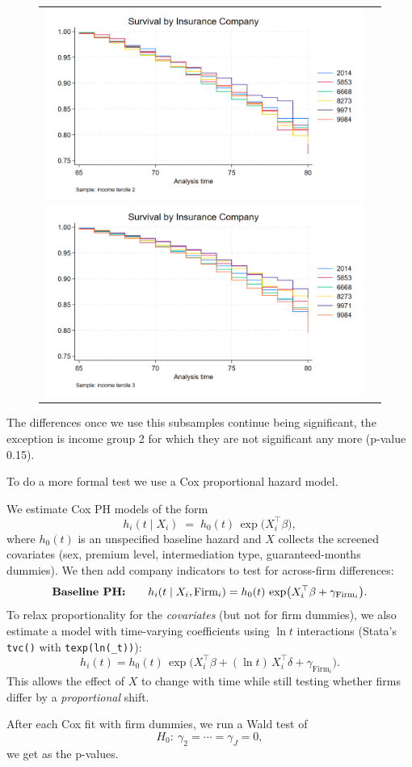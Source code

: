 \documentclass[12pt]{article}
\begin{document}
\begin{figure}[H]
\caption{}
\label{fig:ie6_2}
\centering{}%
\begin{tabular}{cc}
\includegraphics[scale=0.25]{../figures/IE6/IE6_survival_year_income2.png} \includegraphics[scale=0.25]{../figures/IE6/IE6_survival_year_income3.png} 
\end{tabular}
\end{figure}

The differences once we use this subsamples continue being significant, the exception is income group 2 for which they are not significant any more (p-value 0.15).

To do a more formal test we use a Cox proportional hazard model.


We estimate Cox PH models of the form
\[
h_i(t \mid X_i) \;=\; h_0(t)\,\exp\!\big( X_i^\top \beta \big),
\]
where \(h_0(t)\) is an unspecified baseline hazard and \(X\) collects the screened covariates (sex, premium level, intermediation type, guaranteed-months dummies). We then add company indicators to test for across-firm differences:
\[
\text{\bf Baseline PH:}\qquad
h_i(t \mid X_i,\text{Firm}_i)=h_0(t)\,\exp\!\big( X_i^\top \beta + \gamma_{\text{Firm}_i} \big).
\]
To relax proportionality for the \emph{covariates} (but not for firm dummies), we also estimate a model with time-varying coefficients using \(\ln t\) interactions (Stata’s \texttt{tvc()} with \texttt{texp(ln(\_t))}):
\[
h_i(t)=h_0(t)\,\exp\!\big( X_i^\top \beta + (\ln t)\,X_i^\top \delta + \gamma_{\text{Firm}_i} \big).
\]
This allows the effect of \(X\) to change with time while still testing whether firms differ by a \emph{proportional} shift.

After each Cox fit with firm dummies, we run a Wald test of
$$H_0:\ \gamma_2=\cdots=\gamma_J=0,$$
we get  as the p-values. 
\end{document}
